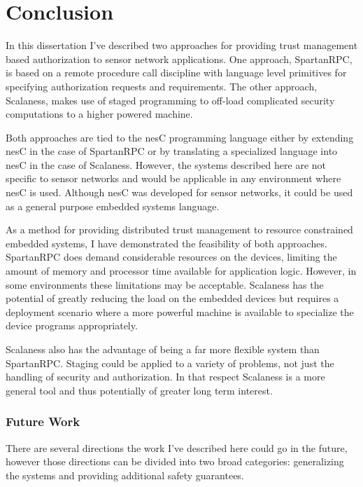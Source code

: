 
\chapter{Conclusion}
\label{chapter-conclusion}


In this dissertation I've described two approaches for providing trust management based
authorization to sensor network applications. One approach, SpartanRPC, is based on a remote
procedure call discipline with language level primitives for specifying authorization requests
and requirements. The other approach, Scalaness, makes use of staged programming to off-load
complicated security computations to a higher powered machine.

Both approaches are tied to the nesC programming language either by extending nesC in the case
of SpartanRPC or by translating a specialized language into nesC in the case of Scalaness.
However, the systems described here are not specific to sensor networks and would be applicable
in any environment where nesC is used. Although nesC was developed for sensor networks, it could
be used as a general purpose embedded systems language.

As a method for providing distributed trust management to resource constrained embedded systems,
I have demonstrated the feasibility of both approaches. SpartanRPC does demand considerable
resources on the devices, limiting the amount of memory and processor time available for
application logic. However, in some environments these limitations may be acceptable. Scalaness
has the potential of greatly reducing the load on the embedded devices but requires a deployment
scenario where a more powerful machine is available to specialize the device programs
appropriately.

Scalaness also has the advantage of being a far more flexible system than SpartanRPC. Staging
could be applied to a variety of problems, not just the handling of security and authorization.
In that respect Scalaness is a more general tool and thus potentially of greater long term
interest.

\subsection{Future Work}
\label{section-future-work}

There are several directions the work I've described here could go in the future, however those
directions can be divided into two broad categories: generalizing the systems and providing
additional safety guarantees.

